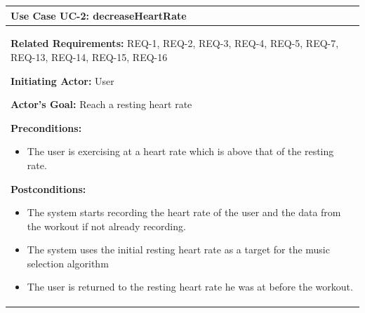 \documentclass[letterpaper,english, 12pt]{scrreprt}
\begin{document}
\begin{center}
        \begin{tabular}{|C{15cm}|}
                \hline
                        \textbf{Use Case UC-2: decreaseHeartRate}\\
                \hline
                        \begin{flushleft}
                                \textbf{Related Requirements: } REQ-1, REQ-2, REQ-3, REQ-4, REQ-5, REQ-7, REQ-13, REQ-14, REQ-15, REQ-16
                        \end{flushleft}
                        \begin{flushleft}
                                \textbf{Initiating Actor: } User
                        \end{flushleft}
                        \begin{flushleft}
                                \textbf{Actor's Goal: } Reach a resting heart rate
                        \end{flushleft}
                        \begin{flushleft}
                                \textbf{Preconditions: }
                        \end{flushleft}
                                \begin{itemize}
                                        \item The user is exercising at a heart rate which is above that of the resting rate.
                                \end{itemize}
                        \begin{flushleft}
                                \textbf{Postconditions: }
                        \end{flushleft}
                                \begin{itemize}
                                        \item The system starts recording the heart rate of the user and the data from the workout if not already recording.
                                        \item The system uses the initial resting heart rate as a target for the music selection algorithm
                                        \item The user is returned to the resting heart rate he was at before the workout.
                                \end{itemize}
                        \begin{flushleft}

\end{flushleft}
\end{tabular}
\end{center}
\end{document}

